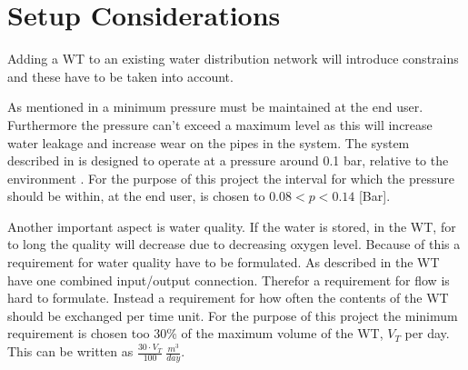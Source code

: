 

\section{Setup Considerations}



Adding a WT to an existing water distribution network will introduce constrains and these have to be taken into account. 

As mentioned in  a minimum pressure must be maintained at the end user. Furthermore the pressure can't exceed a maximum level as this will increase water leakage and increase wear on the pipes in the system. The system described in  is designed to operate at a pressure around 0.1 bar, relative to the environment \cite{master_aau}. For the purpose of this project the interval for which the pressure should be within, at the end user, is chosen to $0.08 < p < 0.14$ [Bar].

Another important aspect is water quality. If the water is stored, in the WT, for to long the quality will decrease due to decreasing oxygen level. Because of this a requirement for water quality have to be formulated. As described in  the WT have one combined input/output connection. Therefor a requirement for flow is hard to formulate. Instead a requirement for how often the contents of the WT should be exchanged per time unit. For the purpose of this project the minimum requirement is chosen too 30\% of the maximum volume of the WT, $V_T$ per day. This can be written as $\frac{30\cdot V_T}{100} \: \frac{m^3}{day}$.










 
 